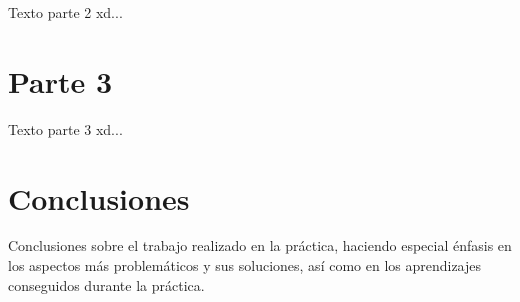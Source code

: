 \documentclass[a4paper, 11pt, oneside]{article} %
\begin{document}
Texto parte 2 xd...
	
\newpage


\section{Parte 3}

Texto parte 3 xd...

\newpage


\section{Conclusiones}

Conclusiones sobre el trabajo realizado en la práctica, haciendo especial énfasis en los aspectos más problemáticos y sus soluciones, así como en los aprendizajes conseguidos durante la práctica.
\end{document}
